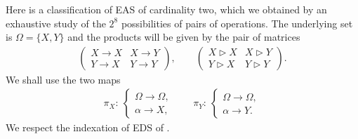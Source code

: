 \documentclass[10pt,a4paper]{amsart}
\numberwithin{equation}{section}
\begin{document}
Here is a classification of EAS of cardinality two, which we obtained by an exhaustive study of the $2^8$ possibilities of pairs of operations. The underlying set is $\Omega=\{X,Y\}$ and the products will be given by the pair of matrices
\begin{align*}
\begin{pmatrix}
X\rightarrow X&X\rightarrow Y\\Y\rightarrow X&Y\rightarrow Y
\end{pmatrix},\qquad
\begin{pmatrix}
X\triangleright X&X\triangleright Y\\Y\triangleright X&Y\triangleright Y
\end{pmatrix}.
\end{align*}
We shall use the two maps
\begin{align*}
\pi_X\colon \ \begin{cases}
\Omega\longrightarrow\Omega,\\
\alpha\longrightarrow X,
\end{cases}\qquad
\pi_Y\colon \ \begin{cases}
\Omega\longrightarrow\Omega,\\
\alpha\longrightarrow Y.
\end{cases}
\end{align*}
We respect the indexation of EDS of \cite{Foissy49}.
\end{document}
